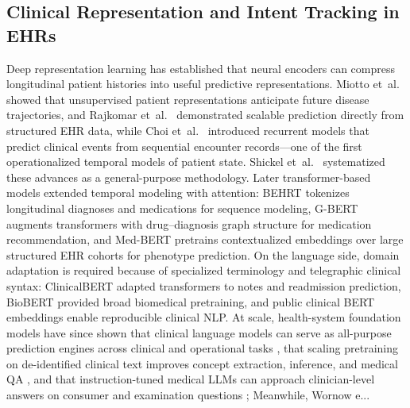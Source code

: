 \documentclass[11pt]{article}
\begin{document}
\subsection{Clinical Representation and Intent Tracking in EHRs}
Deep representation learning has established that neural encoders can compress longitudinal patient histories into useful predictive representations. Miotto et~al.\ \citep{miotto2016} showed that unsupervised patient representations anticipate future disease trajectories, and Rajkomar et~al.\ \citep{rajkomar2018} demonstrated scalable prediction directly from structured EHR data, while Choi et~al.\ \citep{choi2016_doctorai} introduced recurrent models that predict clinical events from sequential encounter records---one of the first operationalized temporal models of patient state. Shickel et~al.\ \citep{shickel2017} systematized these advances as a general-purpose methodology. Later transformer-based models extended temporal modeling with attention: BEHRT \citep{li2020_behrt} tokenizes longitudinal diagnoses and medications for sequence modeling, G-BERT \citep{shang2019_gbert} augments transformers with drug--diagnosis graph structure for medication recommendation, and Med-BERT \citep{rasmy2021_medbert} pretrains contextualized embeddings over large structured EHR cohorts for phenotype prediction. On the language side, domain adaptation is required because of specialized terminology and telegraphic clinical syntax: ClinicalBERT \citep{huang2019_clinicalbert} adapted transformers to notes and readmission prediction, BioBERT \citep{lee2020_biobert} provided broad biomedical pretraining, and public clinical BERT embeddings \citep{alsentzer2019} enable reproducible clinical NLP. At scale, health-system foundation models have since shown that clinical language models can serve as all-purpose prediction engines across clinical and operational tasks \citep{jiang2023_nyutron}, that scaling pretraining on de-identified clinical text improves concept extraction, inference, and medical QA \citep{yang2022_gatortron}, and that instruction-tuned medical LLMs can approach clinician-level answers on consumer and examination questions \citep{singhal2023_medpalm}; Meanwhile, Wornow e...
\end{document}

